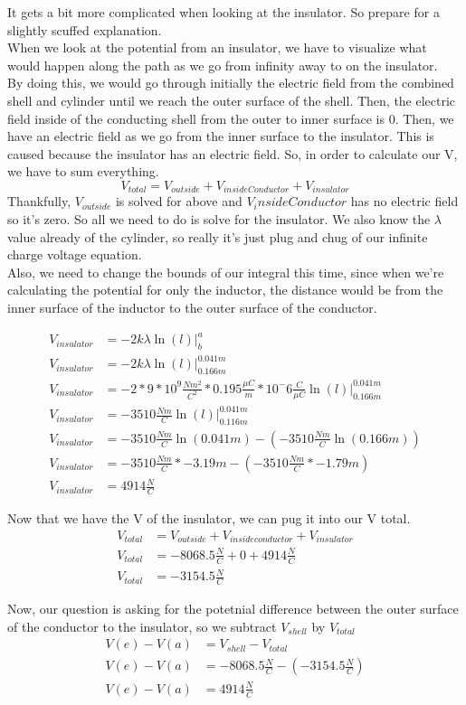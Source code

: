 \documentclass{article}
\begin{document}
It gets a bit more complicated when looking at the insulator. So prepare for a slightly scuffed explanation.\\

When we look at the potential from an insulator, we have to visualize what would happen along the path as we go from infinity away to on the insulator.\\ By doing this, we would go through initially the electric field from the combined shell and cylinder until we reach the outer surface of the shell. Then, the electric field inside of the conducting shell from the outer to inner surface is 0. Then, we have an electric field as we go from the inner surface to the insulator. This is caused because the insulator has an electric field. So, in order to calculate our V, we have to sum everything.
\[
	V_{total} = V_{outside} + V_{inside Conductor} + V_{insulator} 
\]
Thankfully, $V_{outside}$ is solved for above and $V_inside Conductor$ has no electric field so it's zero. So all we need to do is solve for the insulator. We also know the $\lambda$ value already of the cylinder, so really it's just plug and chug of our infinite charge voltage equation.\\
Also, we need to change the bounds of our integral this time, since when we're calculating the potential for only the inductor, the distance would be from the inner surface of the inductor to the outer surface of the conductor.

\begin{align*}
	V_{insulator} &= -2k\lambda\ln(l)\bigg|^a_{b}\\
	V_{insulator} &= -2k\lambda\ln(l)\bigg|^{0.041m}_{0.166m}\\
	V_{insulator}&= -2 * 9 * 10^9 \frac{Nm^2}{C^2} * 0.195 \frac{\mu C}{m} * 10^-6 \frac{C}{\mu C} \ln(l)\bigg|^{0.041m}_{0.166m}\\
	V_{insulator} &= -3510 \frac{Nm}{C} \ln(l)\bigg|^{0.041m}_{0.116m}\\
	V_{insulator} &= -3510 \frac{Nm}{C}\ln(0.041m) -  (-3510 \frac{Nm}{C}\ln(0.166m)) \\
	V_{insulator} &= -3510 \frac{Nm}{C}* -3.19m - ( -3510 \frac{Nm}{C}* -1.79m)\\
	V_{insulator} &= 4914 \frac{N}{C}
\end{align*}

Now that we have the V of the insulator, we can pug it into our V total.
\begin{align*}
	V_{total} &= V_{outside} + V_{inside conductor} + V_{insulator}\\
	V_{total} &= -8068.5 \frac{N}{C} + 0 + 4914 \frac{N}{C}\\
	V_{total} &= -3154.5 \frac{N}{C}
\end{align*}

Now, our question is asking for the potetnial difference between the outer surface of the conductor to the insulator, so we subtract $V_{shell}$ by $V_{total} $
\begin{align*}
	V(e) - V(a) &= V_{shell} - V_{total}\\
	V(e) - V(a) &= -8068.5 \frac{N}{C} - (-3154.5 \frac{N}{C})\\
	V(e) - V(a) &= 4914 \frac{N}{C}
\end{align*}
\end{document}
